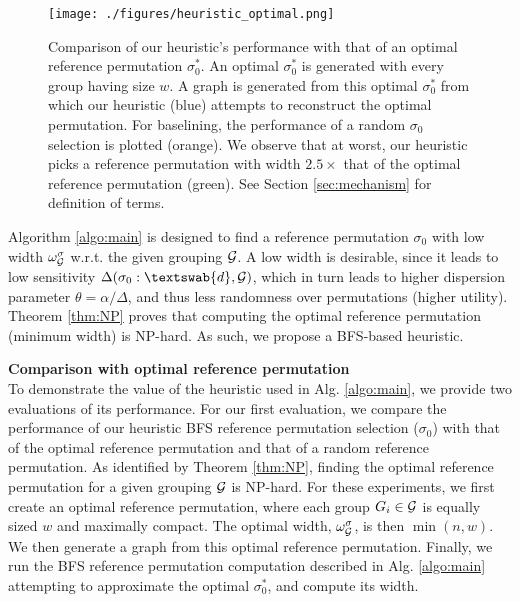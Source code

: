 \begin{figure}[h]
    \centering
    \texttt{[image: ./figures/heuristic\_optimal.png]}
    \caption[Comparison of our heuristic's performance with that of an optimal reference permutation $\sigma^*_0$.]{Comparison of our heuristic's performance with that of an optimal reference permutation $\sigma^*_0$. An optimal $\sigma^*_0$ is generated with every group having size $w$. A graph is generated from this optimal $\sigma^*_0$ from which our heuristic (blue) attempts to reconstruct the optimal permutation. For baselining, the performance of a random $\sigma_0$ selection is plotted (orange). We observe that at worst, our heuristic picks a reference permutation with width $2.5\times$ that of the optimal reference permutation (green). See Section \ref{sec:mechanism} for definition of terms.}
    \label{fig:heuristic optimal}
\end{figure}

Algorithm \ref{algo:main} is designed to find a reference permutation $\sigma_0$ with low width $\omega_{\mathcal{G}}^\sigma$ w.r.t. the given grouping $\mathcal{G}$. A low width is desirable, since it leads to low sensitivity $\Delta(\sigma_0 : \textswab{d}, \calG)$, which in turn leads to higher dispersion parameter $\theta = \alpha / \Delta$, and thus less randomness over permutations (higher utility). Theorem \ref{thm:NP} proves that computing the optimal reference permutation (minimum width) is NP-hard. As such, we propose a BFS-based heuristic. 

\textbf{Comparison with optimal reference permutation}\\
To demonstrate the value of the heuristic used in Alg. \ref{algo:main}, we provide two evaluations of its performance. 
For our first evaluation, we compare the performance of our heuristic BFS reference permutation selection ($\sigma_0$) with that of the optimal reference permutation  and that of a random reference permutation. As identified by Theorem \ref{thm:NP}, finding the optimal reference permutation for a given grouping $\mathcal{G}$ is NP-hard. For these experiments, we first create an optimal reference permutation, where each group $G_i \in \mathcal{G}$ is equally sized $w$ and maximally compact. The optimal width, $\omega_{\mathcal{G}}^\sigma$, is then $\min(n, w)$. We then generate a graph from this optimal reference permutation. Finally, we run the BFS reference permutation computation described in Alg. \ref{algo:main} attempting to approximate the optimal $\sigma^*_0$, and compute its width. 

